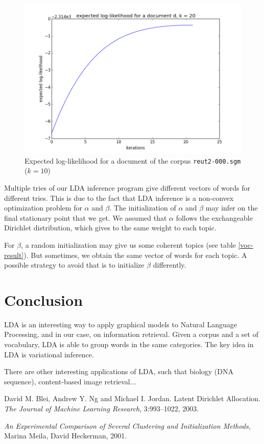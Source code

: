 \documentclass{article}
\begin{document}
\begin{figure}[ht!]
\begin{center}
\includegraphics[width=0.5\linewidth]{../img/k=20/log_likelihood_document_k=20.png}
\caption{Expected log-likelihood for a document of the corpus \texttt{reut2-000.sgm} ($k=10$)}
\label{log-likelihood-doc}
\end{center}
\end{figure}

Multiple tries of our LDA inference program give different vectors of words for different tries. This is due to the fact that LDA inference is a non-convex optimization problem for $\alpha$ and $\beta$. The initialization of $\alpha$ and $\beta$ may infer on the final  stationary point that we get. We assumed that $\alpha$ follows the exchangeable Dirichlet distribution, which gives to the same weight to each topic.  

For $\beta$, a random initialization may give us some coherent topics (see table \ref{voc-result}). But sometimes, we obtain the same vector of words for each topic. A possible strategy to avoid that is to initialize $\beta$ differently.

\section{Conclusion}

LDA is an interesting way to apply graphical models to Natural Language Processing, and in our case, on information retrieval. Given a corpus and a set of vocabulary, LDA is able to group words in the same categories. The key idea in LDA is variational inference. 

There are other interesting applications of LDA, such that biology (DNA sequence), content-based image retrieval$\ldots$

\begin{thebibliography}{BNJ03}
 David M. Blei, Andrew Y. Ng and Michael I. Jordan. Latent Dirichlet Allocation. \emph{The Journal of Machine Learning Research}, 3:993--1022, 2003.

 \emph{An Experimental Comparison of Several Clustering and Initialization Methods}, Marina Meila, David Heckerman, 2001.
\end{thebibliography}
\end{document}
